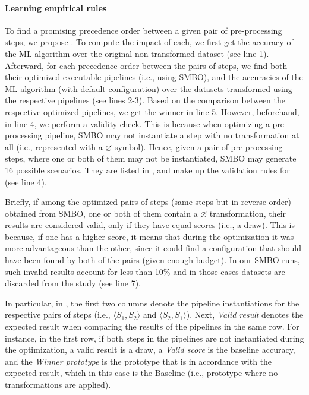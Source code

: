 \paragraph{Learning empirical rules}
To find a promising precedence order between a given pair of pre-processing steps, we propose .
To compute the impact of each, we first get the accuracy of the ML algorithm over the original non-transformed dataset (see line 1). %
Afterward, for each precedence order between the pairs of steps, we find both their optimized executable pipelines (i.e., using SMBO), and the accuracies of the ML algorithm (with default configuration) over the datasets transformed using the respective pipelines (see lines 2-3).
Based on the comparison between the respective optimized pipelines, we get the winner in line 5.
However, beforehand, in line 4, we perform a validity check.
This is because when optimizing a pre-processing pipeline, SMBO may not instantiate a step with no transformation at all (i.e., represented with a $\varnothing$ symbol).
Hence, given a pair of pre-processing steps, where one or both of them may not be instantiated, SMBO may generate 16 possible scenarios.
They are listed in , and make up the validation rules for  (see line 4).

Briefly, if among the optimized pairs of steps (same steps but in reverse order) obtained from SMBO, one or both of them contain a $\varnothing$ transformation, their results are considered valid, only if they have equal scores (i.e., a draw).
This is because, if one has a higher score, it means that during the optimization it was more advantageous than the other, since it could find a configuration that should have been found by both of the pairs (given enough budget).
In our SMBO runs, such invalid results account for less than 10\% and in those cases datasets are discarded from the study (see line 7).

In particular, in , the first two columns denote the pipeline instantiations for the respective pairs of steps (i.e., $\langle S_1, S_2 \rangle$ and $\langle S_2, S_1 \rangle$).
Next, \textit{Valid result} denotes the expected result when comparing the results of the pipelines in the same row.
For instance, in the first row, if both steps in the pipelines are not instantiated during the optimization, a valid result is a draw, a \textit{Valid score} is the baseline accuracy, and the \textit{Winner prototype} is the prototype that is in accordance with the expected result, which in this case is the Baseline (i.e., prototype where no transformations are applied).

